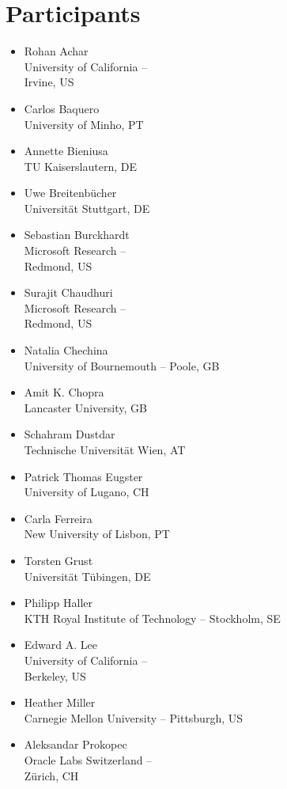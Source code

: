\documentclass[a4paper,UKenglish]{dagrep-v2018}
\begin{document}
\section{Participants}
\begin{multicols}{3}
  \begin{itemize}
  \item Rohan Achar\\University of California -- \\Irvine, US
  \item Carlos Baquero\\University of Minho, PT
  \item Annette Bieniusa\\TU Kaiserslautern, DE
  \item Uwe Breitenb{\"u}cher\\Universit{\"a}t Stuttgart, DE
  \item Sebastian Burckhardt\\Microsoft Research -- \\Redmond, US
  \item Surajit Chaudhuri\\Microsoft Research -- \\Redmond, US
  \item Natalia Chechina\\University of Bournemouth -- Poole, GB
  \item Amit K. Chopra\\Lancaster University, GB
  \item Schahram Dustdar\\Technische Universit{\"a}t Wien, AT
  \item Patrick Thomas Eugster\\University of Lugano, CH
  \item Carla Ferreira\\New University of Lisbon, PT
  \item Torsten Grust\\Universit{\"a}t T{\"u}bingen, DE
  \item Philipp Haller\\KTH Royal Institute of Technology -- Stockholm, SE
  \item Edward A. Lee\\University of California -- \\Berkeley, US
  \item Heather Miller\\Carnegie Mellon University -- Pittsburgh, US
  \item Aleksandar Prokopec\\Oracle Labs Switzerland -- \\Z{\"u}rich, CH

\end{itemize}
\end{multicols}
\end{document}
